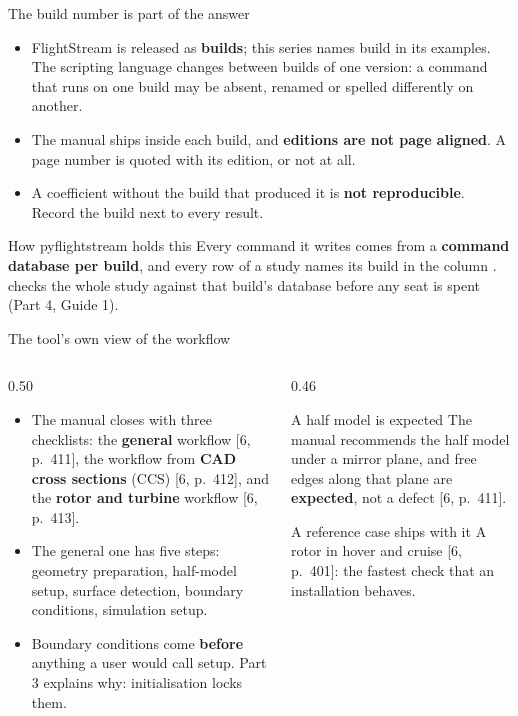 \begin{frame}{The build number is part of the answer}
\begin{itemize}\small
  \item FlightStream is released as \textbf{builds}; this series names build
        \fsbuild{} in its examples. The scripting language changes between
        builds of one version: a command that runs on one build may be absent,
        renamed or spelled differently on another.
  \item The manual ships inside each build, and \textbf{editions are not page
        aligned}. A page number is quoted with its edition, or not at all.
  \item A coefficient without the build that produced it is \textbf{not
        reproducible}. Record the build next to every result.
\end{itemize}
\begin{block}{How pyflightstream holds this}
\small Every command it writes comes from a \textbf{command database per
build}, and every row of a study names its build in the column
.  checks the whole study against that build's
database before any seat is spent (Part 4, Guide 1).
\end{block}
\end{frame}

\begin{frame}{The tool's own view of the workflow}
\begin{columns}[T]
\begin{column}{0.50\textwidth}
\begin{itemize}\small
  \item The manual closes with three checklists: the \textbf{general}
        workflow [6, p.~411], the workflow from \textbf{CAD cross sections}
        (CCS) [6, p.~412], and the \textbf{rotor and turbine} workflow
        [6, p.~413].
  \item The general one has five steps: geometry preparation, half-model
        setup, surface detection, boundary conditions, simulation setup.
  \item Boundary conditions come \textbf{before} anything a user would call
        setup. Part 3 explains why: initialisation locks them.
\end{itemize}
\end{column}
\begin{column}{0.46\textwidth}
\begin{block}{A half model is expected}
\small The manual recommends the half model under a mirror plane, and free
edges along that plane are \textbf{expected}, not a defect [6, p.~411].
\end{block}
\begin{block}{A reference case ships with it}
\small A rotor in hover and cruise [6, p.~401]: the fastest check that an
installation behaves.
\end{block}
\end{column}
\end{columns}
\end{frame}

